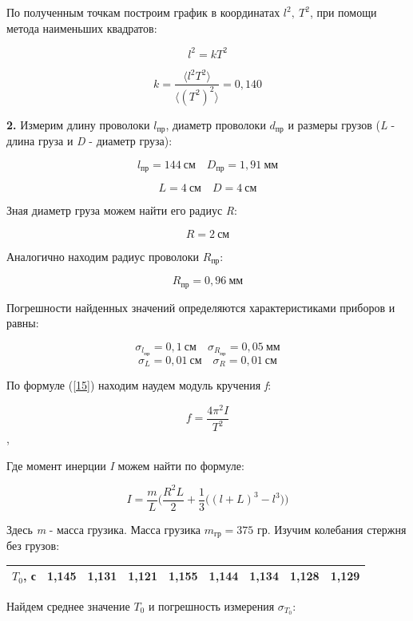 \documentclass[12pt,a4paper]{article}
\begin{document}
\vspace{0,5cm}

По полученным точкам построим график в координатах $l^2,\: T^2$, при помощи метода наименьших квадратов:

\[l^2 = k T^2\]

\[k = \frac{\langle l^2 T^2 \rangle}{\langle(T^2)^2\rangle}  = 0,140\]

\textbf{2.} Измерим длину проволоки $\textit{l}_{\text{пр}}$, диаметр проволоки $d_{\text{пр}}$ и размеры грузов (\textit{L} - длина груза и \textit{D} - диаметр груза):

\[\textit{l}_{\text{пр}} = 144\: \text{см} \quad \textit{D}_{\text{пр}} = 1,91\: \text{мм}\]

\[L = 4\: \text{см} \quad D = 4\: \text{см}\]

Зная диаметр груза можем найти его радиус \textit{R}:

\[R = 2\: \text{см}\]

Аналогично находим радиус проволоки $\textit{R}_{\text{пр}}$:

\[\textit{R}_{\text{пр}} = 0,96\: \text{мм}\] 

Погрешности найденных значений определяются характеристиками приборов и равны:

\[\sigma_{\textit{l}_{\text{пр}}} = 0,1\: \text{см} \quad \sigma_{\textit{R}_{\text{пр}}} = 0,05\: \text{мм}\]
\[\sigma_L = 0,01\: \text{см} \quad \sigma_R = 0,01\: \text{см}\]

По формуле (\ref{15}) находим наудем модуль кручения \textit{f}:

\[f = \frac{4\pi^2 I}{T^2}\],

Где момент инерции \textit{I} можем найти по формуле:

\[I = \frac{m}{L}\Big(\frac{R^2 L}{2} + \frac{1}{3}\big((l + L)^3 - l^3\big)\Big)\]

Здесь \textit{m} - масса грузика. Масса грузика $m _{\text{гр}} = 375$ гр. Изучим колебания стержня без грузов:

\vspace{0,5cm}

\begin{tabular}{|c|c|c|c|c|c|c|c|c|}
\hline
$T_0$, с & 1,145 & 1,131 & 1,121 & 1,155 & 1,144 & 1,134 & 1,128 & 1,129 \\
\hline
\end{tabular}

\vspace{0,5cm} 

Найдем среднее значение $\textit{T}_0$ и погрешность измерения $\sigma_{T_0}$:
\end{document}
